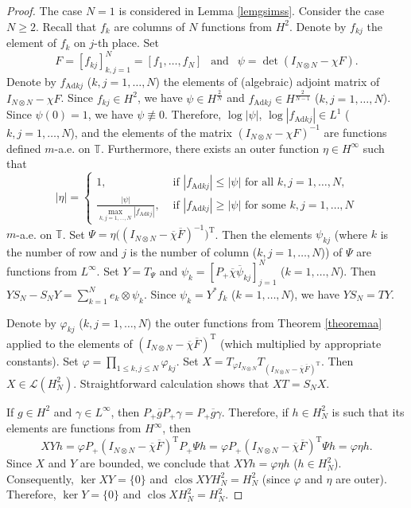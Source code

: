 \documentclass[a4paper,oneside,11pt]{amsart}
\numberwithin{equation}{section}
\theoremstyle{plain}
\theoremstyle{definition}
\begin{document}
\begin{proof} The case $N=1$ is considered in Lemma \ref{lemgsimss}.  Consider the case $N\geq 2$.  
Recall that $f_k$ are columns of $N$  functions from $H^2$. 
Denote by $f_{kj}$ the element of $f_k$ on $j$-th place. 
Set \begin{equation*} F=[f_{kj}]_{k,j=1}^N=[f_1, \ldots, f_N] \ \ \text{ and } \ \ \psi=\det(I_{N\otimes N}-\chi F).
\end{equation*}
 Denote by $f_{\mathrm{Ad}kj}$ 
($k,j=1,\ldots,N$) the elements of (algebraic) adjoint matrix of $I_{N\otimes N}-\chi F$. 
 Since  $f_{kj}\in H^2$, we have $\psi\in H^{\frac {2}{N}}$ and 
 $f_{\mathrm{Ad}kj}\in H^{\frac {2}{N-1}}$ 
($k,j=1,\ldots,N$). 
Since $\psi(0)=1$, we have $\psi\not\equiv 0$. Therefore, 
$\log|\psi|$, $\log|f_{\mathrm{Ad}kj}|\in L^1$ ($k,j=1,\ldots,N$), 
and the elements of the matrix $(I_{N\otimes N}-\chi F)^{-1}$ are functions defined 
$m$-a.e. on $\mathbb T$.  Furthermore, there exists an outer function $\eta\in H^\infty$ such that 
\begin{equation*} |\eta|=\begin{cases} 1, &\text{ if } |f_{\mathrm{Ad}kj}|\leq |\psi| \text { for all } k,j=1,\ldots,N,\\
\displaystyle{ \frac{|\psi|}{\max_{k,j=1,\ldots,N}|f_{\mathrm{Ad}kj}|}}, &\text{ if } |f_{\mathrm{Ad}kj}|\geq |\psi| \text { for some } k,j=1,\ldots,N
\end{cases}  \end{equation*}
$m$-a.e. on $\mathbb T$.
Set $\Psi=\eta\bigl((I_{N\otimes N}-\overline\chi \overline F)^{-1}\bigr)^{\mathrm T}$. 
Then the elements $\psi_{kj}$ (where $k$ is the number of row and $j$ is the number of column ($k,j=1,\ldots,N$))
 of $\Psi$ are functions from $L^\infty$. Set $Y=T_\Psi$ and 
 $\psi_k=[P_+\overline\chi\overline\psi_{kj}]_{j=1}^N$ ($k=1,\ldots,N$). Then 
$YS_N-S_NY=\sum_{k=1}^{N}e_k\otimes \psi_k$. Since $\psi_k=Y^*f_k$ ($k=1,\ldots,N$), we have  $YS_N=TY$. 

Denote by $\varphi_{kj}$ ($k,j=1,\ldots,N$) 
the outer  functions from Theorem \ref{theoremaa} applied to the elements of 
$(I_{N\otimes N}-\overline\chi \overline F)^{\mathrm T}$ (which multiplied by appropriate constants). Set $\varphi=\prod_{1\leq k,j\leq N}\varphi_{kj}$. 
Set $X=T_{\varphi I_{N\otimes N}}T_{(I_{N\otimes N}-\overline\chi \overline F)^{\mathrm T}}$. Then 
$X\in\mathcal L(H^2_N)$.  
Straightforward calculation shows that $XT=S_NX$. 

If $g\in H^2$ and $\gamma\in L^\infty$, then $P_+\overline gP_+\gamma=P_+\overline g\gamma$. 
 Therefore, if  $h\in H^2_N$ is such that its  elements are functions from $H^\infty$, then  
\begin{equation*} XYh=\varphi P_+(I_{N\otimes N}-\overline\chi \overline F)^{\mathrm T}P_+\Psi h=
\varphi P_+(I_{N\otimes N}-\overline\chi \overline F)^{\mathrm T}\Psi h=\varphi\eta h.
 \end{equation*}
Since $X$ and $Y$ are bounded, we conclude that $XYh=\varphi\eta h$ ($h\in H^2_N$). 
Consequently,  $\ker XY=\{0\}$ and $\operatorname{clos}XYH^2_N=H^2_N$ (since $\varphi$ and $\eta$ are outer).
Therefore, $\ker Y=\{0\}$ and $\operatorname{clos}XH^2_N=H^2_N$.
\end{proof}
\end{document}
